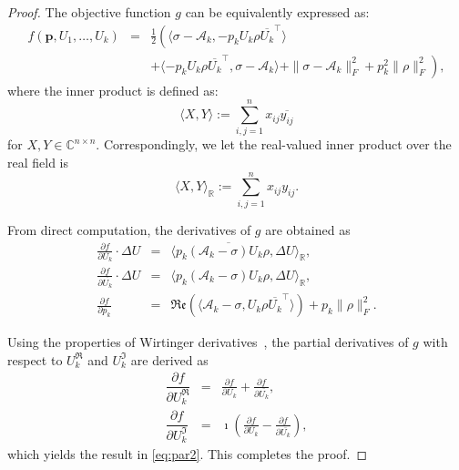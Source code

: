 \documentclass[onefignum,onetabnum]{siamart220329}
\begin{document}
    \begin{proof}
    The objective function $g$ can be equivalently expressed as:
    \begin{eqnarray}\label{eq:objdec}
        f(\mathbf{p}, U_1, \ldots, U_k) &=& 
        \frac{1}{2} \left( \langle \sigma - \mathcal{A}_k, -p_k U_k \rho \overline{U_k}^\top \rangle \right. \nonumber \\
        && \left. + \langle -p_k U_k \rho \overline{U_k}^\top, \sigma - \mathcal{A}_k \rangle + \|\sigma - \mathcal{A}_k\|_F^2 + p_k^2\|\rho\|_F^2 \right),
    \end{eqnarray}
    where the inner product is defined as:
    \begin{equation*}
        \langle X, Y \rangle := \sum_{i,j=1}^n x_{ij} \overline{y_{ij}}
    \end{equation*}
    for $X, Y \in \mathbb{C}^{n \times n}$.  Correspondingly, we let the real-valued inner product over the real field is
    \begin{equation*}
        \langle X, Y \rangle_{\mathbb{R}} := \sum_{i,j=1}^n x_{ij} y_{ij}.
    \end{equation*}
    
    From direct computation, the derivatives of $g$ are obtained as
    \begin{eqnarray*}
        \frac{\partial f}{\partial U_k} \cdot \Delta U &=& \langle p_k \overline{(\mathcal{A}_k - \sigma) U_k \rho}, \Delta U \rangle_{\mathbb{R}}, \\
        \frac{\partial f}{\partial \overline{U_k}} \cdot \Delta U &=& \langle p_k (\mathcal{A}_k - \sigma) U_k \rho, \Delta U \rangle_{\mathbb{R}}, \\
        \frac{\partial f}{\partial p_k} &=& \mathfrak{Re} \left(\langle \mathcal{A}_k - \sigma, U_k \rho \overline{U_k}^\top \rangle \right)+p_k \|\rho\|_F^2.
    \end{eqnarray*}
    
    Using the properties of Wirtinger derivatives~\cite{Brandwood1983, Krantz2001}, the partial derivatives of $g$ with respect to $ 
    U_k^\mathfrak{R}
    $ and $U_k^\mathfrak{I}
    $ are derived as
    \begin{eqnarray*}
        \dfrac{\partial f}{\partial U_k^\mathfrak{R}
        } &=& \frac{\partial f}{\partial U_k} + \frac{\partial f}{\partial \overline{U_k}}, \\
            \dfrac{\partial f}{\partial U_k^\mathfrak{I} } &=& \imath\left(\frac{\partial f}{\partial U_k} - \frac{\partial f}{\partial \overline{U_k}}\right), 
    \end{eqnarray*}
    which yields the result in \eqref{eq:par2}. This completes the proof.
    \end{proof}
    
\end{document}
